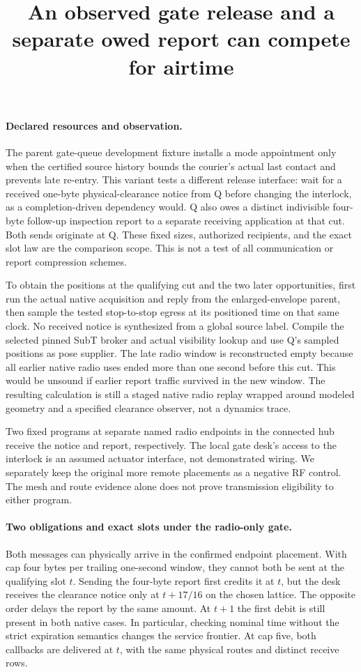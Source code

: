 \documentclass{article}
\title{An observed gate release and a separate owed report can compete for airtime}
\author{}
\date{}
\begin{document}
\maketitle
\paragraph{Declared resources and observation.}
The parent gate-queue development fixture installs a mode
appointment only when the certified source history bounds the
courier's actual last contact and prevents late re-entry. This
variant tests a different release interface: wait for a received
one-byte physical-clearance notice from Q before changing the
interlock, as a completion-driven dependency would. Q also owes
a distinct indivisible four-byte follow-up inspection report to
a separate receiving application at that cut. Both sends originate
at Q. These fixed sizes, authorized recipients, and the exact
slot law are the comparison scope. This is not a test of all
communication or report compression schemes.

To obtain the positions at the qualifying cut and the two later
opportunities, first run the actual native acquisition and reply
from the enlarged-envelope parent, then sample the tested
stop-to-stop egress at its positioned time on that same clock.
No received notice is synthesized from a global source label.
Compile the selected pinned SubT broker and actual visibility
lookup and use Q's sampled positions as pose supplier. The late
radio window is reconstructed empty because all earlier native
radio uses ended more than one second before this cut. This
would be unsound if earlier report traffic survived in the new
window. The resulting calculation is still a staged native
radio replay wrapped around modeled geometry and a specified
clearance observer, not a dynamics trace.

Two fixed programs at separate named radio endpoints in the
connected hub receive the notice and report, respectively. The
local gate desk's access to the interlock is an assumed actuator
interface, not demonstrated wiring. We separately keep the
original more remote placements as a negative RF control. The
mesh and route evidence alone does not prove transmission
eligibility to either program.

\paragraph{Two obligations and exact slots under the radio-only gate.}
Both messages can physically arrive in the confirmed endpoint
placement. With cap four bytes per trailing one-second window,
they cannot both be sent at the qualifying slot \(t\).
Sending the four-byte report first credits it at \(t\),
but the desk receives the clearance notice only at
\(t+17/16\) on the chosen lattice. The opposite order delays
the report by the same amount. At \(t+1\) the first debit is
still present in both native cases. In particular, checking
nominal time without the strict expiration semantics changes
the service frontier. At cap five, both callbacks are delivered
at \(t\), with the same physical routes and distinct receive rows.
\end{document}
